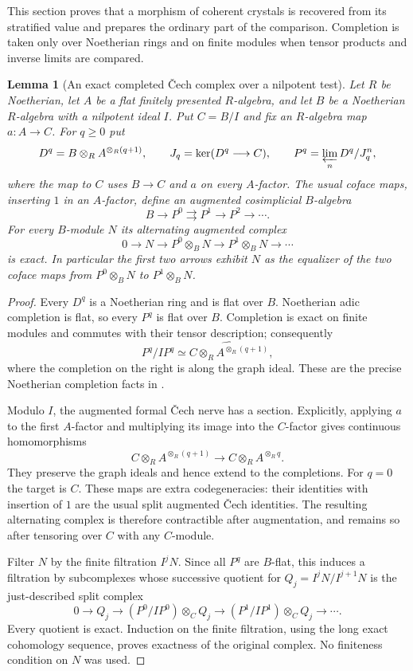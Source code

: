 \documentclass[11pt]{article}
\newtheorem{lemma}[theorem]{Lemma}\newtheorem{proposition}[theorem]{Proposition}
\theoremstyle{definition}\newtheorem{definition}[theorem]{Definition}
\theoremstyle{remark}\newtheorem{remark}[theorem]{Remark}
\begin{document}
This section proves that a morphism of coherent crystals is recovered from its stratified value and prepares the ordinary part of the comparison. Completion is taken only over Noetherian rings and on finite modules when tensor products and inverse limits are compared.

\begin{lemma}[An exact completed \v{C}ech complex over a nilpotent test]\label{lem:cech}
Let $R$ be Noetherian, let $A$ be a flat finitely presented $R$-algebra, and let $B$ be a Noetherian $R$-algebra with a nilpotent ideal $I$.  Put $C=B/I$ and fix an $R$-algebra map $a:A\to C$.  For $q\geq0$ put
\[
 D^q=B\otimes_R A^{\otimes_R(q+1)},\qquad
 J_q=\ker(D^q\longrightarrow C),\qquad
 P^q=\varprojlim_n D^q/J_q^n,
\]
where the map to $C$ uses $B\to C$ and $a$ on every $A$-factor.  The usual coface maps, inserting $1$ in an $A$-factor, define an augmented cosimplicial $B$-algebra
\[
                    B\longrightarrow P^0\rightrightarrows P^1
                              \longrightarrow P^2\longrightarrow\cdots.
\]
For every $B$-module $N$ its alternating augmented complex
\[
 0\longrightarrow N\longrightarrow P^0\otimes_BN
       \longrightarrow P^1\otimes_BN\longrightarrow\cdots
\]
is exact.  In particular the first two arrows exhibit $N$ as the equalizer of the two coface maps from $P^0\otimes_BN$ to $P^1\otimes_BN$.
\end{lemma}
\begin{proof}
Every $D^q$ is a Noetherian ring and is flat over $B$.  Noetherian adic completion is flat, so every $P^q$ is flat over $B$.  Completion is exact on finite modules and commutes with their tensor description; consequently
\[
 P^q/IP^q\simeq
 \widehat{C\otimes_R A^{\otimes_R(q+1)}},
\]
where the completion on the right is along the graph ideal.  These are the precise Noetherian completion facts in \citet[Lemmas~10.97.1--6, especially Tags~00MA and~00MB]{StacksProject}.

Modulo $I$, the augmented formal \v{C}ech nerve has a section.  Explicitly, applying $a$ to the first $A$-factor and multiplying its image into the $C$-factor gives continuous homomorphisms
\[
 C\otimes_R A^{\otimes_R(q+1)}
       \longrightarrow C\otimes_R A^{\otimes_R q}.
\]
They preserve the graph ideals and hence extend to the completions.  For $q=0$ the target is $C$.  These maps are extra codegeneracies: their identities with insertion of $1$ are the usual split augmented \v{C}ech identities.  The resulting alternating complex is therefore contractible after augmentation, and remains so after tensoring over $C$ with any $C$-module.

Filter $N$ by the finite filtration $I^jN$.  Since all $P^q$ are $B$-flat, this induces a filtration by subcomplexes whose successive quotient for $Q_j=I^jN/I^{j+1}N$ is the just-described split complex
\[
 0\longrightarrow Q_j\longrightarrow
 (P^0/IP^0)\otimes_CQ_j\longrightarrow
 (P^1/IP^1)\otimes_CQ_j\longrightarrow\cdots.
\]
Every quotient is exact.  Induction on the finite filtration, using the long exact cohomology sequence, proves exactness of the original complex.  No finiteness condition on $N$ was used.
\end{proof}
\end{document}

